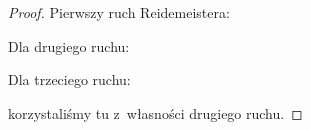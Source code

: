 \begin{proof}
    Pierwszy ruch Reidemeistera:
\begin{comment}
    \begin{align}
        \bracket{\MediumReidemeisterOneLeft} & \stackrel{K2}{=} A
        \bracket{\MediumReidemeisterOneSmoothA} +
        A^{-1} \bracket{\MediumReidemeisterOneSmoothB} \\ & \stackrel{K3}{=}
        A \bracket{\MediumReidemeisterOneStraight} +
        A^{-1}(-A^{-2}-A^2) \bracket{\MediumReidemeisterOneStraight} =
        -A^{-3}\bracket{\MediumReidemeisterOneStraight}
    \end{align}
\end{comment}

    Dla drugiego ruchu:
\begin{comment}
    \begin{align}
        \bracket{\MediumKauffmanReidemeisterTwoA} & \stackrel{K2}{=}
        A \bracket{\MediumKauffmanReidemeisterTwoB} +
        A^{-1} \bracket{\MediumKauffmanReidemeisterTwoC} \\ & \stackrel{K1}{=}
        -A^{-2} \bracket{\MediumBetaSmoothing} +
        A^{-1} \bracket{\MediumKauffmanReidemeisterTwoC} \\ & \stackrel{K2}{=}
        -A^{-2} \bracket{\MediumBetaSmoothing} +
        A^{-1}A \bracket{\MediumAlphaSmoothing} +
        A^{-1}A^{-1} \bracket{\MediumBetaSmoothing} \\ & =
        \bracket{\MediumAlphaSmoothing}
    \end{align}
\end{comment}

    Dla trzeciego ruchu:
\begin{comment}
    \begin{align}
    \bracket{\MediumKauffmanReidemeisterThreeA} & \stackrel{K2}{=}
    A \bracket{\MediumKauffmanReidemeisterThreeB} +
    A^{-1} \bracket{\MediumKauffmanReidemeisterThreeC} \stackrel{R2}{=}
    A \bracket{\MediumKauffmanReidemeisterThreeD} +
    A^{-1} \bracket{\MediumKauffmanReidemeisterThreeE} \\ & \stackrel{R2}{=}
    A \bracket{\MediumKauffmanReidemeisterThreeFlippedB} +
    A^{-1} \bracket{\MediumKauffmanReidemeisterThreeFlippedC} \stackrel{K2}{=}
    \bracket{\MediumKauffmanReidemeisterThreeFlippedA},
    \end{align}
\end{comment}
    korzystaliśmy tu z~własności drugiego ruchu.
\end{proof}

